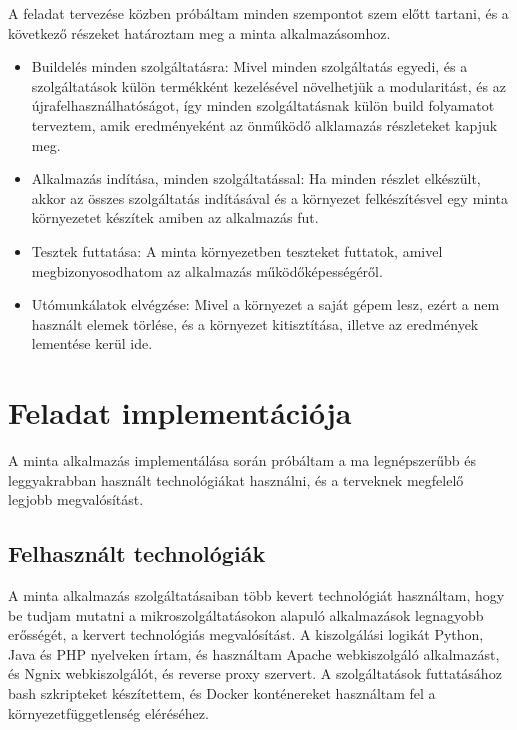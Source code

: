 \documentclass[11pt,magyar,a4paper,twoside,]{report}
\providecommand{\tightlist}{%
  \setlength{\itemsep}{0pt}\setlength{\parskip}{0pt}}
\begin{document}
A feladat tervezése közben próbáltam minden szempontot szem előtt
tartani, és a következő részeket határoztam meg a minta alkalmazásomhoz.

\begin{itemize}
\tightlist
\item
  Buildelés minden szolgáltatásra: Mivel minden szolgáltatás egyedi, és
  a szolgáltatások külön termékként kezelésével növelhetjük a
  modularitást, és az újrafelhasználhatóságot, így minden
  szolgáltatásnak külön build folyamatot terveztem, amik eredményeként
  az önműködő alklamazás részleteket kapjuk meg.
\item
  Alkalmazás indítása, minden szolgáltatással: Ha minden részlet
  elkészült, akkor az összes szolgáltatás indításával és a környezet
  felkészítésvel egy minta környezetet készítek amiben az alkalmazás
  fut.
\item
  Tesztek futtatása: A minta környezetben teszteket futtatok, amivel
  megbizonyosodhatom az alkalmazás működőképességéről.
\item
  Utómunkálatok elvégzése: Mivel a környezet a saját gépem lesz, ezért a
  nem használt elemek törlése, és a környezet kitisztítása, illetve az
  eredmények lementése kerül ide.
\end{itemize}

\chapter{Feladat implementációja}\label{feladat-implementuxe1ciuxf3ja}

A minta alkalmazás implementálása során próbáltam a ma legnépszerűbb és
leggyakrabban használt technológiákat használni, és a terveknek
megfelelő legjobb megvalósítást.

\section{Felhasznált
technológiák}\label{felhasznuxe1lt-technoluxf3giuxe1k}

A minta alkalmazás szolgáltatásaiban több kevert technológiát
használtam, hogy be tudjam mutatni a mikroszolgáltatásokon alapuló
alkalmazások legnagyobb erősségét, a kervert technológiás megvalósítást.
A kiszolgálási logikát Python, Java és PHP nyelveken írtam, és
használtam Apache webkiszolgáló alkalmazást, és Ngnix webkiszolgálót, és
reverse proxy szervert. A szolgáltatások futtatásához bash szkripteket
készítettem, és Docker konténereket használtam fel a
környezetfüggetlenség eléréséhez.
\end{document}
